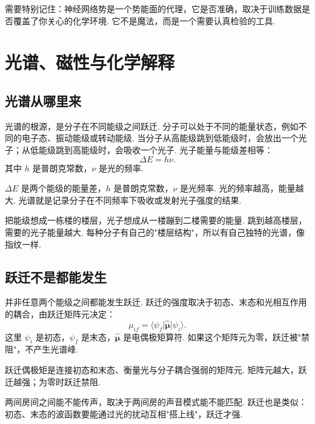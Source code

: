 \documentclass[UTF8,11pt,a4paper,openany]{ctexbook}
\newcommand{\ket}[1]{\lvert #1\rangle}\newcommand{\bra}[1]{\langle #1\rvert}
\begin{document}
需要特别记住：神经网络势是一个势能面的代理，它是否准确，取决于训练数据是否覆盖了你关心的化学环境. 它不是魔法，而是一个需要认真检验的工具. 
\chapter{光谱、磁性与化学解释}

\section{光谱从哪里来}

光谱的根源，是分子在不同能级之间跃迁. 分子可以处于不同的能量状态，例如不同的电子态、振动能级或转动能级. 当分子从高能级跳到低能级时，会放出一个光子；从低能级跳到高能级时，会吸收一个光子. 光子能量与能级差相等：
\[
\Delta E=h\nu.
\]
其中 $h$ 是普朗克常数，$\nu$ 是光的频率. 

\begin{notationbox}
$\Delta E$ 是两个能级的能量差，$h$ 是普朗克常数，$\nu$ 是光频率. 光的频率越高，能量越大. 光谱就是记录分子在不同频率下吸收或发射光子强度的结果. 
\end{notationbox}

\begin{analogybox}
把能级想成一栋楼的楼层，光子想成从一楼蹦到二楼需要的能量. 跳到越高楼层，需要的光子能量越大. 每种分子有自己的"楼层结构"，所以有自己独特的光谱，像指纹一样. 
\end{analogybox}

\section{跃迁不是都能发生}

并非任意两个能级之间都能发生跃迁. 跃迁的强度取决于初态、末态和光相互作用的耦合，由跃迁矩阵元决定：
\[
\mu_{if}=\bra{\psi_f}\hat{\boldsymbol\mu}\ket{\psi_i}.
\]
这里 $\psi_i$ 是初态，$\psi_f$ 是末态，$\hat{\boldsymbol\mu}$ 是电偶极矩算符. 如果这个矩阵元为零，跃迁被"禁阻"，不产生光谱峰. 

\begin{definitionbox}
跃迁偶极矩是连接初态和末态、衡量光与分子耦合强弱的矩阵元. 矩阵元越大，跃迁越强；为零时跃迁禁阻. 
\end{definitionbox}

\begin{analogybox}
两间房间之间能不能传声，取决于两间房的声音模式能不能匹配. 跃迁也是类似：初态、末态的波函数要能通过光的扰动互相"搭上线"，跃迁才强. 
\end{analogybox}
\end{document}
